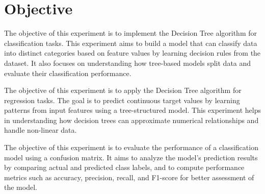 \documentclass[11pt,a4paper]{article}
\begin{document}
    
\tableofcontents
\thispagestyle{empty}
\clearpage
{}
    
	
\section{Objective}

The objective of this experiment is to implement the Decision Tree algorithm for classification tasks. This experiment aims to build a model that can classify data into distinct categories based on feature values by learning decision rules from the dataset. It also focuses on understanding how tree-based models split data and evaluate their classification performance.

The objective of this experiment is to apply the Decision Tree algorithm for regression tasks. The goal is to predict continuous target values by learning patterns from input features using a tree-structured model. This experiment helps in understanding how decision trees can approximate numerical relationships and handle non-linear data.

The objective of this experiment is to evaluate the performance of a classification model using a confusion matrix. It aims to analyze the model's prediction results by comparing actual and predicted class labels, and to compute performance metrics such as accuracy, precision, recall, and F1-score for better assessment of the model.







    
    
    
\end{document}
